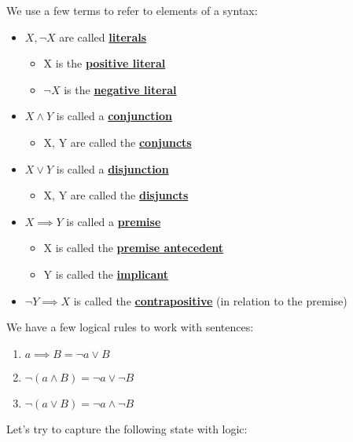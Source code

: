 \documentclass[../../lecture_notes.tex]{subfiles}
\begin{document}
\noindent We use a few terms to refer to elements of a syntax:
\begin{itemize} [itemsep=0mm]
	\item $X, \neg X$ are called \textbf{\underline{literals}}
		\begin{itemize} [itemsep=0mm]
			\item X is the \textbf{\underline{positive literal}}
			\item $\neg X$ is the \textbf{\underline{negative literal}}
		\end{itemize}
	\item $X \land Y$ is called a \textbf{\underline{conjunction}}
		\begin{itemize} [itemsep=0mm]
			\item X, Y are called the \textbf{\underline{conjuncts}}
		\end{itemize}
	\item $X \lor Y$ is called a \textbf{\underline{disjunction}}
		\begin{itemize} [itemsep=0mm]
			\item X, Y are called the \textbf{\underline{disjuncts}}
		\end{itemize}
	\item $X \implies Y$ is called a \textbf{\underline{premise}}
		\begin{itemize} [itemsep=0mm]
			\item X is called the \textbf{\underline{premise antecedent}}
			\item Y is called the \textbf{\underline{implicant}}
		\end{itemize}
	\item $\neg Y \implies X$ is called the \textbf{\underline{contrapositive}} (in relation to the premise)
\end{itemize} \medskip

\noindent We have a few logical rules to work with sentences:
\begin{enumerate} [itemsep=0mm]
	\item $a \implies B = \neg a \lor B$
	\item $\neg(a \land B) = \neg a \lor \neg B$
	\item $\neg(a \lor B) = \neg a \land \neg B$
\end{enumerate} \medskip

\noindent Let’s try to capture the following state with logic:
\end{document}
